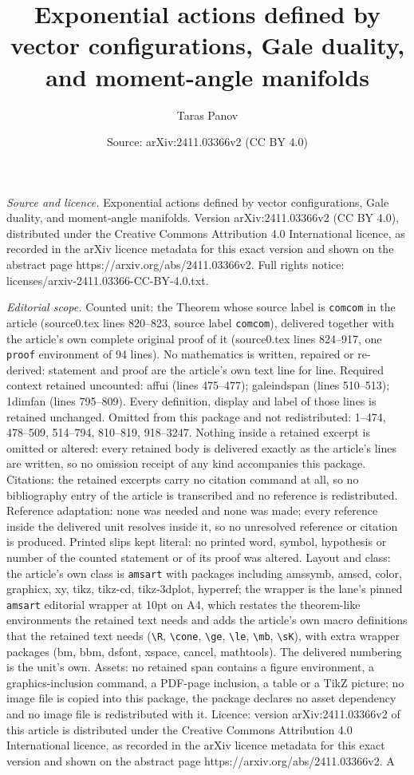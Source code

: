 \documentclass[10pt,a4paper]{amsart}
\title[Exponential actions defined by vector configurations, Gale d]{Exponential actions defined by vector configurations, Gale duality, and moment-angle manifolds}
\author{Taras Panov}
\date{Source: arXiv:2411.03366v2 (CC BY 4.0)}
\begin{document}
\maketitle

\noindent\emph{Source and licence.} Exponential actions defined by vector configurations, Gale duality, and moment-angle manifolds. Version arXiv:2411.03366v2 (CC BY 4.0), distributed under the Creative Commons Attribution 4.0 International licence, as recorded in the arXiv licence metadata for this exact version and shown on the abstract page https://arxiv.org/abs/2411.03366v2. Full rights notice: licenses/arxiv-2411.03366-CC-BY-4.0.txt.\par\smallskip

\noindent\textit{Editorial scope.} Counted unit: the Theorem whose source label is \texttt{comcom} in the article (source0.tex lines 820--823, source label \texttt{comcom}), delivered together with the article's own complete original proof of it (source0.tex lines 824--917, one \texttt{proof} environment of 94 lines). No mathematics is written, repaired or re-derived: statement and proof are the article's own text line for line. Required context retained uncounted: affui (lines 475--477); galeindspan (lines 510--513); 1dimfan (lines 795--809). Every definition, display and label of those lines is retained unchanged. Omitted from this package and not redistributed: 1--474, 478--509, 514--794, 810--819, 918--3247. Nothing inside a retained excerpt is omitted or altered: every retained body is delivered exactly as the article's lines are written, so no omission receipt of any kind accompanies this package. Citations: the retained excerpts carry no citation command at all, so no bibliography entry of the article is transcribed and no reference is redistributed. Reference adaptation: none was needed and none was made; every reference inside the delivered unit resolves inside it, so no unresolved reference or citation is produced. Printed slips kept literal: no printed word, symbol, hypothesis or number of the counted statement or of its proof was altered. Layout and class: the article's own class is \texttt{amsart} with packages including amssymb, amscd, color, graphicx, xy, tikz, tikz-cd, tikz-3dplot, hyperref; the wrapper is the lane's pinned \texttt{amsart} editorial wrapper at 10pt on A4, which restates the theorem-like environments the retained text needs and adds the article's own macro definitions that the retained text needs (\texttt{\textbackslash R}, \texttt{\textbackslash cone}, \texttt{\textbackslash ge}, \texttt{\textbackslash le}, \texttt{\textbackslash mb}, \texttt{\textbackslash sK}), with extra wrapper packages (bm, bbm, dsfont, xspace, cancel, mathtools). The delivered numbering is the unit's own. Assets: no retained span contains a figure environment, a graphics-inclusion command, a PDF-page inclusion, a table or a TikZ picture; no image file is copied into this package, the package declares no asset dependency and no image file is redistributed with it. Licence: version arXiv:2411.03366v2 of this article is distributed under the Creative Commons Attribution 4.0 International licence, as recorded in the arXiv licence metadata for this exact version and shown on the abstract page https://arxiv.org/abs/2411.03366v2. A 
\end{document}
